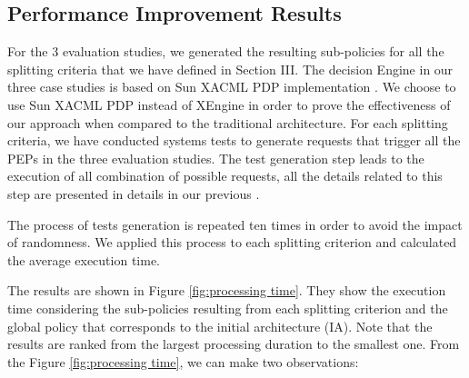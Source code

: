 \subsection{Performance Improvement Results}
For the 3 evaluation studies, we generated the resulting sub-policies for all the splitting criteria that we have defined in Section III.
The decision Engine in our three case studies is based on Sun XACML PDP implementation \cite{sunxacml}. We choose to use Sun XACML PDP instead of XEngine in order 
to prove the effectiveness of our approach when compared to the traditional architecture.
For each splitting criteria, we have conducted systems tests to generate 
requests that trigger all the PEPs in the three evaluation studies. The test generation step leads to the execution of all combination of possible requests, 
all the details related to this step are presented in details in our previous \cite{testcase}.
  
The process of tests generation is repeated ten times in order to avoid the impact of randomness.
We applied this process to each splitting criterion and calculated the average execution time.


The results are shown in Figure \ref{fig:processing time}. They show the execution time considering the sub-policies resulting from each splitting criterion and the global policy 
that corresponds to the initial architecture (IA). Note that the results are ranked from the largest processing duration to the smallest one. 
From the Figure \ref{fig:processing time}, we can make two observations:

